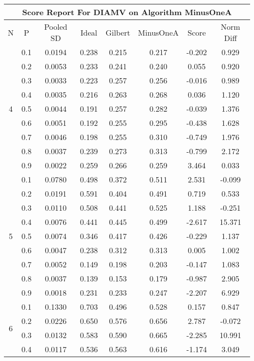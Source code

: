 \documentclass[11pt,a4paper]{report}
\begin{document}
\begin{longtable}{ | c | c || c | c | c | c | c | c | }
\hline
\multicolumn{8}{|c|}{ Score Report For DIAMV on Algorithm MinusOneA} \\
\hline
N & P & Pooled SD &  Ideal &  Gilbert & MinusOneA  & Score & Norm Diff \\
 \hline
 \hline
 \endhead
\multirow{9}{*}{4} & 0.1 & 0.0194 & 0.238 & 0.215 & 0.217 & -0.202 & 0.929 \\
 & 0.2 & 0.0053 & 0.233 & 0.241 & 0.240 & 0.055 & 0.920 \\
 & 0.3 & 0.0033 & 0.223 & 0.257 & 0.256 & -0.016 & 0.989 \\
 & 0.4 & 0.0035 & 0.216 & 0.263 & 0.268 & 0.036 & 1.120 \\
 & 0.5 & 0.0044 & 0.191 & 0.257 & 0.282 & -0.039 & 1.376 \\
 & 0.6 & 0.0051 & 0.192 & 0.255 & 0.295 & -0.438 & 1.628 \\
 & 0.7 & 0.0046 & 0.198 & 0.255 & 0.310 & -0.749 & 1.976 \\
 & 0.8 & 0.0037 & 0.239 & 0.273 & 0.313 & -0.799 & 2.172 \\
 & 0.9 & 0.0022 & 0.259 & 0.266 & 0.259 & 3.464 & 0.033 \\
 \hline
\multirow{9}{*}{5} & 0.1 & 0.0780 & 0.498 & 0.372 & 0.511 & 2.531 & -0.099 \\
 & 0.2 & 0.0191 & 0.591 & 0.404 & 0.491 & 0.719 & 0.533 \\
 & 0.3 & 0.0110 & 0.508 & 0.441 & 0.525 & 1.188 & -0.251 \\
 & 0.4 & 0.0076 & 0.441 & 0.445 & 0.499 & -2.617 & 15.371 \\
 & 0.5 & 0.0074 & 0.346 & 0.417 & 0.426 & -0.229 & 1.137 \\
 & 0.6 & 0.0047 & 0.238 & 0.312 & 0.313 & 0.005 & 1.002 \\
 & 0.7 & 0.0052 & 0.149 & 0.198 & 0.203 & -0.147 & 1.083 \\
 & 0.8 & 0.0037 & 0.139 & 0.153 & 0.179 & -0.987 & 2.905 \\
 & 0.9 & 0.0018 & 0.231 & 0.233 & 0.247 & -2.207 & 6.929 \\
 \hline
\multirow{9}{*}{6} & 0.1 & 0.1330 & 0.703 & 0.496 & 0.528 & 0.157 & 0.847 \\
 & 0.2 & 0.0226 & 0.650 & 0.576 & 0.656 & 2.787 & -0.072 \\
 & 0.3 & 0.0132 & 0.583 & 0.590 & 0.665 & -2.285 & 10.991 \\
 & 0.4 & 0.0117 & 0.536 & 0.563 & 0.616 & -1.174 & 3.049 \\

\end{longtable}
\end{document}
